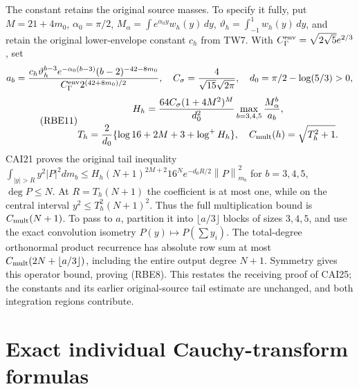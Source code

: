 \documentclass[11pt,a4paper]{article}
\providecommand{\norm}[1]{\left\lVert#1\right\rVert}
\begin{document}
The constant retains the original source masses. To specify it fully,
put \(M=21+4m_0\), \(\alpha_0=\pi/2\),
\(M_\alpha=\int e^{\alpha_0y}w_h(y)\,dy\),
\(\vartheta_h=\int_{-1}^1w_h(y)\,dy\), and retain the original
lower-envelope constant \(c_h\) from TW7. With
\(C_\Gamma^{\rm env}=\sqrt{2\sqrt5}e^{2/3}\), set
\[
 a_b=\frac{c_h\vartheta_h^{b-3}e^{-\alpha_0(b-3)}
                   (b-2)^{-42-8m_0}}
                  {C_\Gamma^{\rm env}2^{(42+8m_0)/2}},
 \quad C_\sigma=\frac4{\sqrt{15}\sqrt{2\pi}},\quad
 d_0=\pi/2-\log(5/3)>0,
\]
\begin{equation}\tag{RBE11}
 \begin{gathered}
 H_h=\frac{64C_\sigma(1+4M^2)^M}{d_0^2}
                  \max_{b=3,4,5}\frac{M_\alpha^b}{a_b},\\
 T_h=\frac2{d_0}\{\log16+2M+3+\log^+H_h\},\quad
 C_{\rm mult}(h)=\sqrt{T_h^2+1}.
 \end{gathered}
\end{equation}
CAI21 proves the original tail inequality
\(\int_{|y|>R}y^2|P|^2dm_b
 \le H_h(N+1)^{2M+2}16^Ne^{-d_0R/2}\norm P_{m_b}^2\)
for \(b=3,4,5\), \(\deg P\le N\). At \(R=T_h(N+1)\)
the coefficient is at most one, while on the central interval
\(y^2\le T_h^2(N+1)^2\). Thus the full multiplication bound is
\(C_{\rm mult}(N+1)\). To pass to \(a\), partition it into
\(\lfloor a/3\rfloor\) blocks of sizes \(3,4,5\), and use
the exact convolution isometry \(P(y)\mapsto P(\sum y_i)\).
The total-degree orthonormal product recurrence has absolute row
sum at most \(C_{\rm mult}(2N+\lfloor a/3\rfloor)\), including
the entire output degree \(N+1\). Symmetry gives this operator
bound, proving (RBE8). This restates the receiving proof of CAI25;
the constants and its earlier original-source tail estimate are
unchanged, and both integration regions contribute.

\section{Exact individual Cauchy-transform formulas}
\end{document}

